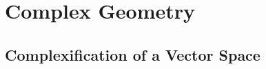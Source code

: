 \chapter{Complex Geometry}
\label{chapter:Complex-Geometry}


\section{Complexification of a Vector Space}